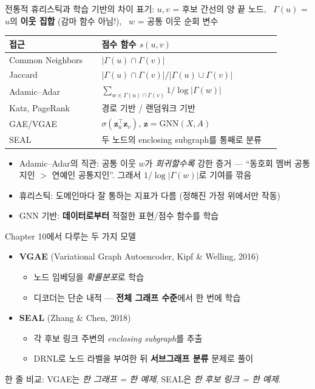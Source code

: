 \begin{frame}{전통적 휴리스틱과 학습 기반의 차이}
\footnotesize
표기: $u,v$ = 후보 간선의 양 끝 노드, \ $\Gamma(u)$ = $u$의 \textbf{이웃 집합} (감마 함수 아님!), \ $w$ = 공통 이웃 순회 변수
\vspace{0.3em}
\small
\begin{tabular}{p{0.32\linewidth} p{0.62\linewidth}}
\toprule
\textbf{접근} & \textbf{점수 함수 $s(u,v)$} \\
\midrule
Common Neighbors & $|\Gamma(u)\cap\Gamma(v)|$ \\
Jaccard          & $|\Gamma(u)\cap\Gamma(v)| / |\Gamma(u)\cup\Gamma(v)|$ \\
Adamic--Adar     & $\sum_{w\in\Gamma(u)\cap\Gamma(v)} 1/\log|\Gamma(w)|$ \\
Katz, PageRank   & 경로 기반 / 랜덤워크 기반 \\
\midrule
GAE/VGAE         & $\sigma(\mathbf{z}_u^\top \mathbf{z}_v)$, $\mathbf{z}=\mathrm{GNN}(X,A)$ \\
SEAL             & 두 노드의 enclosing subgraph를 통째로 분류 \\
\bottomrule
\end{tabular}
\vspace{0.6em}
\begin{itemize}
  \item Adamic--Adar의 직관: 공통 이웃 $w$가 \emph{희귀할수록} 강한 증거 — ``동호회 멤버 공통지인 $>$ 연예인 공통지인''. 그래서 $1/\log|\Gamma(w)|$로 기여를 깎음
  \item 휴리스틱: 도메인마다 잘 통하는 지표가 다름 (정해진 가정 위에서만 작동)
  \item GNN 기반: \textbf{데이터로부터} 적절한 표현/점수 함수를 학습
\end{itemize}
\end{frame}

\begin{frame}{Chapter 10에서 다루는 두 가지 모델}
\begin{itemize}
  \item \textbf{VGAE} (Variational Graph Autoencoder, Kipf \& Welling, 2016)
  \begin{itemize}
    \item 노드 임베딩을 \emph{확률분포}로 학습
    \item 디코더는 단순 내적 — \textbf{전체 그래프 수준}에서 한 번에 학습
  \end{itemize}
  \item \textbf{SEAL} (Zhang \& Chen, 2018)
  \begin{itemize}
    \item 각 후보 링크 주변의 \emph{enclosing subgraph}를 추출
    \item DRNL로 노드 라벨을 부여한 뒤 \textbf{서브그래프 분류} 문제로 풀이
  \end{itemize}
\end{itemize}
\vspace{0.5em}
한 줄 비교: VGAE는 \emph{한 그래프 = 한 예제}, SEAL은 \emph{한 후보 링크 = 한 예제}.
\end{frame}

